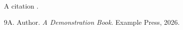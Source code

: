 \documentclass{article}
\begin{document}
A citation \cite{demo}.
\begin{thebibliography}{9}A. Author. \emph{A Demonstration Book}. Example Press, 2026.\end{thebibliography}
\end{document}
